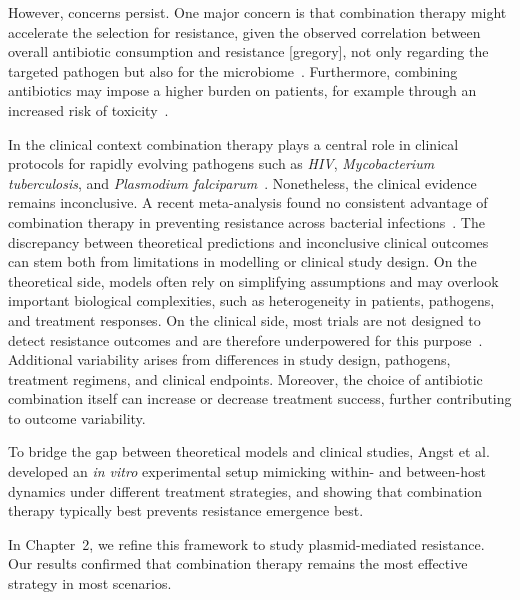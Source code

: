\documentclass[../main.tex]{subfiles}
\begin{document}
However, concerns persist.
One major concern is that combination therapy might accelerate the selection for resistance, given the observed correlation between overall antibiotic consumption and resistance [gregory], not only regarding the targeted pathogen but also for the microbiome~\cite{...}.
Furthermore, combining antibiotics may impose a higher burden on patients, for example through an increased risk of toxicity~\cite{Tamma2012}.

In the clinical context combination therapy plays a central role in clinical protocols for rapidly evolving pathogens such as \textit{HIV}, \textit{Mycobacterium tuberculosis}, and \textit{Plasmodium falciparum}~\cite{Goldberg2012}.
Nonetheless, the clinical evidence remains inconclusive.
A recent meta-analysis found no consistent advantage of combination therapy in preventing resistance across bacterial infections~\cite{siedentop_metaanalysis_2024}.
The discrepancy between theoretical predictions and inconclusive clinical outcomes can stem both from limitations in modelling or clinical study design.
On the theoretical side, models often rely on simplifying assumptions and may overlook important biological complexities, such as heterogeneity in patients, pathogens, and treatment responses.
On the clinical side, most trials are not designed to detect resistance outcomes and are therefore underpowered for this purpose~\cite{siedentop_metaanalysis_2024}.
Additional variability arises from differences in study design, pathogens, treatment regimens, and clinical endpoints.
Moreover, the choice of antibiotic combination itself can increase or decrease treatment success, further contributing to outcome variability.

To bridge the gap between theoretical models and clinical studies, Angst et al.~\cite{Angst2021} developed an \textit{in vitro} experimental setup mimicking within- and between-host dynamics under different treatment strategies, and showing that combination therapy typically best prevents resistance emergence best.

In Chapter~2, we refine this framework to study plasmid-mediated resistance.
Our results confirmed that combination therapy remains the most effective strategy in most scenarios.
\end{document}
